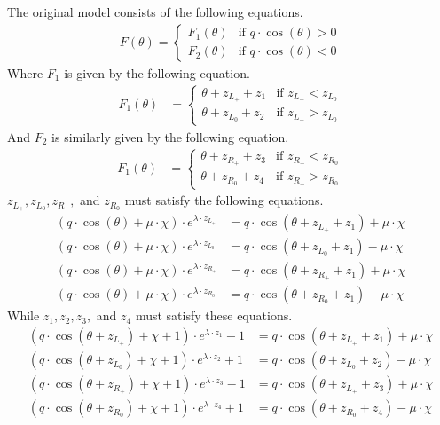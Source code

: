 The original model consists of the following equations.
\begin{align}
    F(\theta) = \begin{cases}
        F_1(\theta) & \text{if } q \cdot \cos(\theta) > 0 \\
        F_2(\theta) & \text{if } q \cdot \cos(\theta) < 0
    \end{cases}
\end{align}
Where $F_1$ is given by the following equation.
\begin{align}
    F_1(\theta) & = \begin{cases}
        \theta + z_{L_+} + z_1 & \text{if } z_{L_+} < z_{L_0} \\
        \theta + z_{L_0} + z_2 & \text{if } z_{L_+} > z_{L_0}
    \end{cases}
\end{align}
And $F_2$ is similarly given by the following equation.
\begin{align}
    F_1(\theta) & = \begin{cases}
        \theta + z_{R_+} + z_3 & \text{if } z_{R_+} < z_{R_0} \\
        \theta + z_{R_0} + z_4 & \text{if } z_{R_+} > z_{R_0}
    \end{cases}
\end{align}
$z_{L_+}, z_{L_0}, z_{R_+},$ and $z_{R_0}$ must satisfy the following equations.
\begin{subequations}
\begin{align}
    (q \cdot \cos(\theta) + \mu \cdot \chi) \cdot e^{\lambda \cdot z_{L_+}}
    & = q \cdot \cos(\theta + z_{L_+} + z_1) + \mu \cdot \chi \\
    (q \cdot \cos(\theta) + \mu \cdot \chi) \cdot e^{\lambda \cdot z_{L_0}}
    & = q \cdot \cos(\theta + z_{L_0} + z_1) - \mu \cdot \chi \\
    (q \cdot \cos(\theta) + \mu \cdot \chi) \cdot e^{\lambda \cdot z_{R_+}}
    & = q \cdot \cos(\theta + z_{R_+} + z_1) + \mu \cdot \chi \\
    (q \cdot \cos(\theta) + \mu \cdot \chi) \cdot e^{\lambda \cdot z_{R_0}}
    & = q \cdot \cos(\theta + z_{R_0} + z_1) - \mu \cdot \chi
\end{align}
\end{subequations}
While $z_1, z_2, z_3,$ and $z_4$ must satisfy these equations.
\begin{subequations}
\begin{align}
    (q \cdot \cos(\theta + z_{L_+}) + \chi + 1) \cdot e^{\lambda \cdot z_1} - 1
    & = q \cdot  \cos(\theta + z_{L_+} + z_1) + \mu \cdot \chi \\
    (q \cdot \cos(\theta + z_{L_0}) + \chi + 1) \cdot e^{\lambda \cdot z_2} + 1
    & = q \cdot  \cos(\theta + z_{L_0} + z_2) - \mu \cdot \chi \\
    (q \cdot \cos(\theta + z_{R_+}) + \chi + 1) \cdot e^{\lambda \cdot z_3} - 1
    & = q \cdot  \cos(\theta + z_{L_+} + z_3) + \mu \cdot \chi \\
    (q \cdot \cos(\theta + z_{R_0}) + \chi + 1) \cdot e^{\lambda \cdot z_4} + 1
    & = q \cdot  \cos(\theta + z_{R_0} + z_4) - \mu \cdot \chi
\end{align}
\end{subequations}

